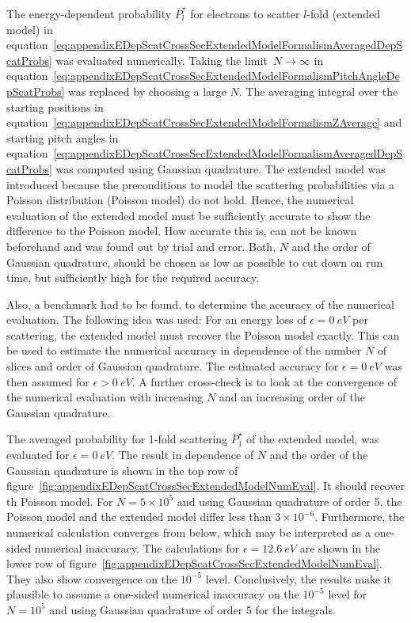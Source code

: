 The energy-dependent probability $\bar{P}^{\star}_l$ for electrons to scatter $l$-fold (extended model) in equation~\eqref{eq:appendixEDepScatCrossSecExtendedModelFormalismAveragedDepScatProbs} was evaluated numerically. Taking the limit~$N\rightarrow\infty$ in equation~\eqref{eq:appendixEDepScatCrossSecExtendedModelFormalismPitchAngleDepScatProbs} was replaced by choosing a large $N$. The averaging integral over the starting positions in equation~\eqref{eq:appendixEDepScatCrossSecExtendedModelFormalismZAverage} and starting pitch angles in equation~\eqref{eq:appendixEDepScatCrossSecExtendedModelFormalismAveragedDepScatProbs} was computed using Gaussian quadrature. The extended model was introduced because the preconditions to model the scattering probabilities via a Poisson distribution (Poisson model) do not hold. Hence, the numerical evaluation of the extended model must be sufficiently accurate to show the difference to the Poisson model. How accurate this is, can not be known beforehand and was found out by trial and error. Both, $N$ and the order of Gaussian quadrature, should be chosen as low as possible to cut down on run time, but sufficiently high for the required accuracy. 

Also, a benchmark had to be found, to determine the accuracy of the numerical evaluation. The following idea was used: For an energy loss of $\epsilon=\SI{0}{eV}$ per scattering, the extended model must recover the Poisson model exactly. This can be used to estimate the numerical accuracy in dependence of the number $N$ of slices and order of Gaussian quadrature. The estimated accuracy for $\epsilon=\SI{0}{eV}$ was then assumed for $\epsilon>\SI{0}{eV}$. A further cross-check is to look at the convergence of the numerical evaluation with increasing $N$ and an increasing order of the Gaussian quadrature.

The averaged probability for 1-fold scattering $\bar{P}^{\star}_1$ of the extended model, was evaluated for $\epsilon=\SI{0}{eV}$. The result in dependence of $N$ and the order of the Gaussian quadrature is shown in the top row of figure~\ref{fig:appendixEDepScatCrossSecExtendedModelNumEval}. It should recover th Poisson model. For $N=5\times10^5$ and using Gaussian quadrature of order 5, the Poisson model and the extended model differ less than $3\times10^{-6}$. Furthermore, the numerical calculation converges from below, which may be interpreted as a one-sided numerical inaccuracy. The calculations for $\epsilon=\SI{12.6}{eV}$ are shown in the lower row of figure~\ref{fig:appendixEDepScatCrossSecExtendedModelNumEval}. They also show convergence on the $10^{-5}$ level. Conclusively, the results make it plausible to assume a one-sided numerical inaccuracy on the $10^{-5}$ level for $N=10^5$ and using Gaussian quadrature of order 5 for the integrals.

